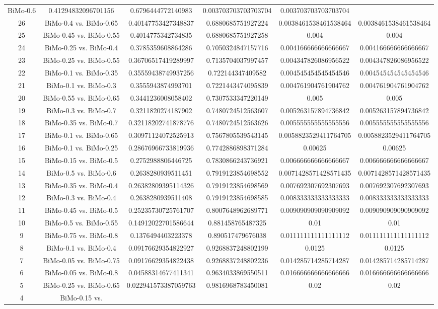 \documentclass[a4paper,10pt]{article}
\begin{document}
\begin{landscape}
\begin{table}[!htp]
\begin{tabular}{cccccc}
BiMo-0.6&0.41294832096701156&0.6796444772140983&0.003703703703703704&0.003703703703703704\\26&BiMo-0.4 vs. BiMo-0.65&0.40147753427348837&0.6880685751927224&0.0038461538461538464&0.0038461538461538464\\25&BiMo-0.45 vs. BiMo-0.55&0.4014775342734835&0.6880685751927258&0.004&0.004\\24&BiMo-0.25 vs. BiMo-0.4&0.3785359608864286&0.7050324847157716&0.004166666666666667&0.004166666666666667\\23&BiMo-0.25 vs. BiMo-0.55&0.36706517419289997&0.7135704037997457&0.004347826086956522&0.004347826086956522\\22&BiMo-0.1 vs. BiMo-0.35&0.35559438749937256&0.722144347409582&0.004545454545454546&0.004545454545454546\\21&BiMo-0.1 vs. BiMo-0.3&0.3555943874993701&0.7221443474095839&0.004761904761904762&0.004761904761904762\\20&BiMo-0.55 vs. BiMo-0.65&0.3441236008058402&0.7307533347220149&0.005&0.005\\19&BiMo-0.3 vs. BiMo-0.7&0.3211820274187902&0.7480724512563607&0.005263157894736842&0.005263157894736842\\18&BiMo-0.35 vs. BiMo-0.7&0.32118202741878776&0.7480724512563626&0.005555555555555556&0.005555555555555556\\17&BiMo-0.1 vs. BiMo-0.65&0.30971124072525913&0.7567805539543145&0.0058823529411764705&0.0058823529411764705\\16&BiMo-0.1 vs. BiMo-0.25&0.28676966733819936&0.7742886898371284&0.00625&0.00625\\15&BiMo-0.15 vs. BiMo-0.5&0.2752988806446725&0.7830866243736921&0.006666666666666667&0.006666666666666667\\14&BiMo-0.5 vs. BiMo-0.6&0.2638280939511451&0.7919123854698552&0.0071428571428571435&0.0071428571428571435\\13&BiMo-0.35 vs. BiMo-0.4&0.26382809395114326&0.7919123854698569&0.007692307692307693&0.007692307692307693\\12&BiMo-0.3 vs. BiMo-0.4&0.2638280939511408&0.7919123854698585&0.008333333333333333&0.008333333333333333\\11&BiMo-0.45 vs. BiMo-0.5&0.25235730725761707&0.8007648962689771&0.009090909090909092&0.009090909090909092\\10&BiMo-0.5 vs. BiMo-0.55&0.14912022701586644&0.881458765487325&0.01&0.01\\9&BiMo-0.75 vs. BiMo-0.8&0.1376494403223378&0.890517479676038&0.011111111111111112&0.011111111111111112\\8&BiMo-0.1 vs. BiMo-0.4&0.09176629354822927&0.9268837248802199&0.0125&0.0125\\7&BiMo-0.05 vs. BiMo-0.75&0.09176629354822438&0.9268837248802236&0.014285714285714287&0.014285714285714287\\6&BiMo-0.05 vs. BiMo-0.8&0.04588314677411341&0.9634033869550511&0.016666666666666666&0.016666666666666666\\5&BiMo-0.25 vs. BiMo-0.65&0.022941573387059763&0.9816968783450081&0.02&0.02\\4&BiMo-0.15 vs. 
\end{tabular}
\end{table}
\end{landscape}
\end{document}

